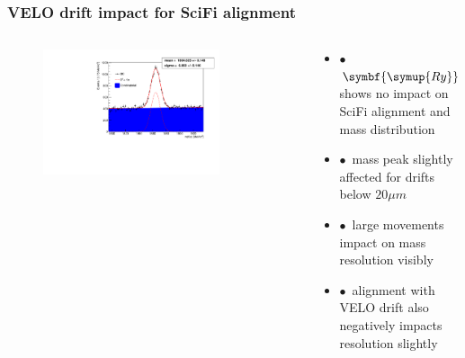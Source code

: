 \documentclass[aspectratio=1610, 12pt, xcolor=dvipsnames]{beamer}
\begin{document}
\begin{frame}\frametitle{VELO drift impact for SciFi alignment}
  \begin{columns}
    \begin{column}[c]{0.48\textwidth}
      \begin{figure}
        \includegraphics[width=0.8\textwidth]{reading_material/current_stuff/velo_drift_plots/plots/Fit_VpTx20Iter4.pdf}
      \end{figure}
    \end{column}
    \begin{column}[c]{0.48\textwidth}
      \begin{itemize}
        \item $\bullet$\, $\symbf{\symup{Ry}}$ shows no impact on SciFi alignment and mass distribution
        \item $\bullet$\, mass peak slightly affected for drifts below $20 \mu m$
        \item $\bullet$\, large movements impact on mass resolution visibly
        \item $\bullet$\, alignment with VELO drift also negatively impacts resolution slightly
      \end{itemize}
    \end{column}
  \end{columns}
\end{frame}
\end{document}
